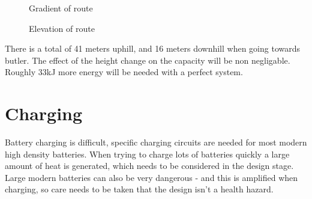 \documentclass{article}
\begin{document}
\begin{figure}[H]
    \centering
    \caption{Gradient of route}
    \label{fig:route_el}
\end{figure}
\begin{figure}[H]
    \centering
    \caption{Elevation of route}
    \label{fig:route_grad}
\end{figure}
There is a total of 41 meters uphill, and 16 meters downhill when going towards butler.
The effect of the height change on the capacity will be non negligable.
Roughly 33kJ more energy will be needed with a perfect system.
\section{Charging}
Battery charging is difficult, specific charging circuits are needed for most modern high density batteries.
When trying to charge lots of batteries quickly a large amount of heat is generated, which needs to be considered in the design stage.
Large modern batteries can also be very dangerous - and this is amplified when charging, so care needs to be taken that the design isn't a health hazard.
\end{document}
